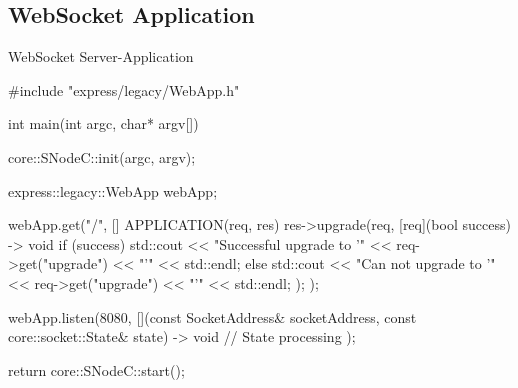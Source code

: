 ﻿\subsection{WebSocket Application}

\begin{frame}[fragile]{WebSocket Server-Application}
  \begin{cppcode}[autogobble=true, caption={WebSocket Server-Application.},captionpos=b,morekeywords={[2]{upgrade}}]
    #include "express/legacy/WebApp.h"

    int main(int argc, char* argv[]) {
        core::SNodeC::init(argc, argv);

        express::legacy::WebApp webApp;

        webApp.get("/", [] APPLICATION(req, res) {
            res->upgrade(req, [req](bool success) -> void {
                if (success) {
                    std::cout << "Successful upgrade to '" << req->get("upgrade") << "'" << std::endl;
                } else {
                    std::cout << "Can not upgrade to '" << req->get("upgrade") << "'" << std::endl;
                }
            });
        });

        webApp.listen(8080, [](const SocketAddress& socketAddress,
                               const core::socket::State& state) -> void {
            // State processing
        });

        return core::SNodeC::start();
    }
  \end{cppcode}
\end{frame}
